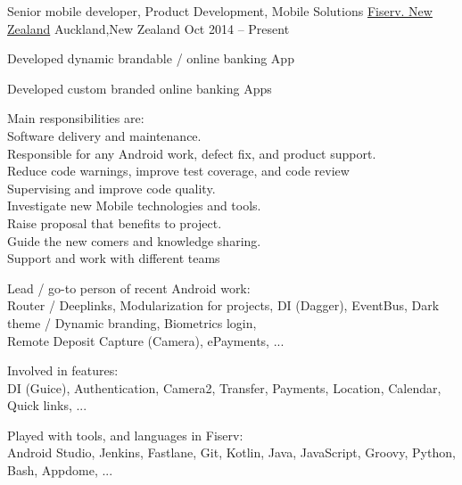 
\begin{cventries}
	\cventry
	{Senior mobile developer, Product Development, Mobile Solutions}
	{\href{https://www.careers.fiserv.com/new-zealand}{Fiserv. New Zealand}}
	{Auckland,\enskip New Zealand}
	{Oct 2014 – Present}
	{
		\begin{cvitems}
			\item {Developed dynamic brandable \href{https://play.google.com/store/apps/details?id=com.fiserv.touchbankingasp&hl=en}{\color{deepblue}{Android}}/\href{https://itunes.apple.com/us/app/touchbanking/id386678211?mt=8}{\color{deepblue}{iPhone}} online banking App}
			\item {Developed custom branded online banking Apps}
			\item 
			{Main responsibilities are: 
				\\\tab * Software delivery and maintenance.
				\\\tab * Responsible for any Android work, defect fix, and product support.
				\\\tab * Reduce code warnings, improve test coverage, and code review
				\\\tab * Supervising and improve code quality.
				\\\tab * Investigate new Mobile technologies and tools.
				\\\tab * Raise proposal that benefits to project.
				\\\tab * Guide the new comers and knowledge sharing.
				\\\tab * Support and work with different teams
			}
			\item {Lead / go-to person of recent Android work: 
				\\\tab Router / Deeplinks, Modularization for projects, DI (Dagger), EventBus, Dark theme / Dynamic branding, Biometrics login, 
				\\\tab Remote Deposit Capture (Camera), ePayments, ...}
			\item {Involved in features: 
				\\\tab DI (Guice), Authentication, Camera2, Transfer, Payments, Location, Calendar, Quick links, ...}
			\item {Played with tools, and languages in Fiserv: 
				\\\tab Android Studio, Jenkins, Fastlane, Git, Kotlin, Java, JavaScript, Groovy, Python, Bash, Appdome, ...}
		\end{cvitems}
	}
\end{cventries}

